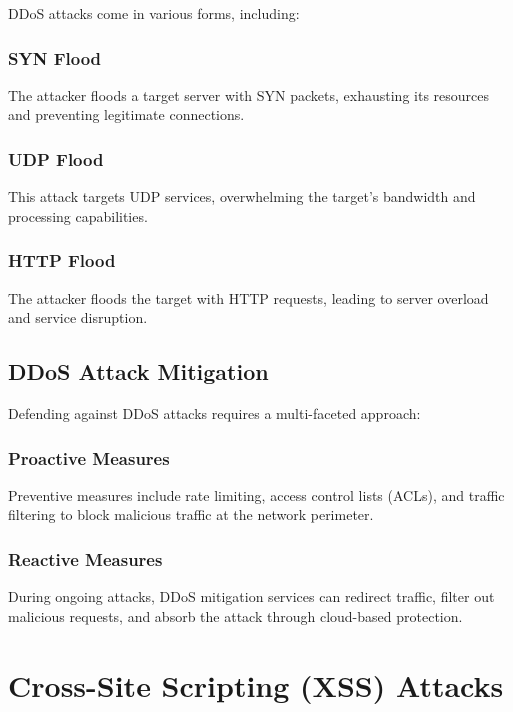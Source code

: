 \documentclass{article}
\begin{document}
DDoS attacks come in various forms, including:

\subsubsection{SYN Flood}

The attacker floods a target server with SYN packets, exhausting its resources and preventing legitimate connections.

\subsubsection{UDP Flood}

This attack targets UDP services, overwhelming the target's bandwidth and processing capabilities.

\subsubsection{HTTP Flood}

The attacker floods the target with HTTP requests, leading to server overload and service disruption.

\subsection{DDoS Attack Mitigation}

Defending against DDoS attacks requires a multi-faceted approach:

\subsubsection{Proactive Measures}

Preventive measures include rate limiting, access control lists (ACLs), and traffic filtering to block malicious traffic at the network perimeter.

\subsubsection{Reactive Measures}

During ongoing attacks, DDoS mitigation services can redirect traffic, filter out malicious requests, and absorb the attack through cloud-based protection.

\section{Cross-Site Scripting (XSS) Attacks}
\end{document}
